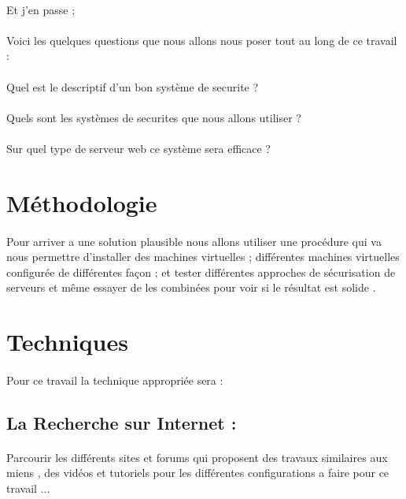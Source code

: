    \paragraph{ }
   Et j'en passe ;
   \pagebreak
   \paragraph{ }
   Voici les  quelques questions que nous allons nous poser tout au long de ce travail :
   \paragraph{ }
   \textendash \space Quel est le descriptif d'un bon système de securite ?
   \paragraph{ }
   \textendash \space Quels sont les systèmes de securites  que nous allons utiliser ?
   \paragraph{ }
   \textendash \space Sur quel type de serveur web ce système sera efficace ?
   \section{Méthodologie}
   \paragraph{ }
   Pour arriver a une solution plausible  nous allons utiliser une procédure  qui va nous permettre d'installer des machines virtuelles ; différentes machines virtuelles configurée de différentes façon  ;  et tester différentes approches de sécurisation de serveurs et même essayer de les combinées pour voir si le résultat est solide .
  \section{ Techniques }
  \paragraph{ }
  Pour ce travail la technique appropriée sera :
  \subsection{ La Recherche sur Internet :}
  \paragraph{ }
  Parcourir les différents  sites et forums qui proposent des travaux similaires aux miens , des vidéos et tutoriels pour les différentes configurations a faire  pour ce travail ...
